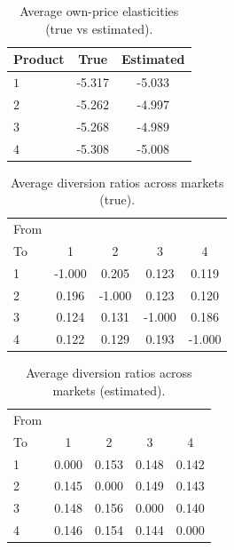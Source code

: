 \begin{table}[H]
\centering
\caption{Average own-price elasticities (true vs estimated).}
\begin{tabular}{lcc}
\hline
Product & True & Estimated\\
\hline
$1$ & -5.317 & -5.033\\
$2$ & -5.262 & -4.997\\
$3$ & -5.268 & -4.989\\
$4$ & -5.308 & -5.008\\
\hline\end{tabular}\end{table}

\begin{table}[H]\centering
\caption{Average diversion ratios across markets (true).}
\begin{tabular}{lcccc}\hline From\\To & 1 & 2 & 3 & 4\\\hline
1 & -1.000 & 0.205 & 0.123 & 0.119\\
2 & 0.196 & -1.000 & 0.123 & 0.120\\
3 & 0.124 & 0.131 & -1.000 & 0.186\\
4 & 0.122 & 0.129 & 0.193 & -1.000\\
\hline\end{tabular}\end{table}

\begin{table}[H]\centering
\caption{Average diversion ratios across markets (estimated).}
\begin{tabular}{lcccc}\hline From\\To & 1 & 2 & 3 & 4\\\hline
1 & 0.000 & 0.153 & 0.148 & 0.142\\
2 & 0.145 & 0.000 & 0.149 & 0.143\\
3 & 0.148 & 0.156 & 0.000 & 0.140\\
4 & 0.146 & 0.154 & 0.144 & 0.000\\
\hline\end{tabular}\end{table}
